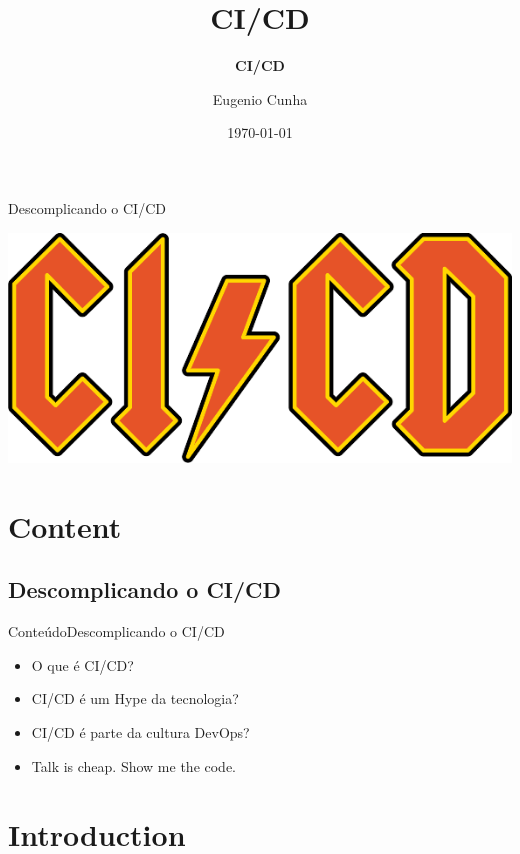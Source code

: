 \documentclass[10pt]{beamer}
\title[] %
{ %
      \textbf{CI/CD}
}
\subtitle[Descomplicando o CI/CD]
{
      \textbf{CI/CD}
}
\author[Eugenio Cunha]
{      Eugenio Cunha
      {}
}
\institute[]
{
      TWT Info
}
\date{\today}
\begin{document}




\begin{frame}{Descomplicando o CI/CD}{}
    \begin{center}
        \includegraphics[scale=0.3]{images/cicd}
    \end{center}
\end{frame}

\section{Content}

\subsection{Descomplicando o CI/CD}
\begin{frame}{Conteúdo}{Descomplicando o CI/CD}
  \begin{itemize}
    \item O que é CI/CD?
    \item CI/CD é um Hype da tecnologia?
    \item CI/CD é parte da cultura DevOps?
    \item Talk is cheap. Show me the code.
  \end{itemize}
\end{frame}

\section{Introduction}
\end{document}
